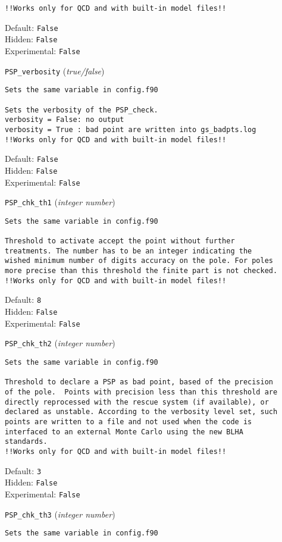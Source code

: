 \begin{basedescript}{\desclabelstyle{\pushlabel}}
\begin{verbatim}
!!Works only for QCD and with built-in model files!!
\end{verbatim}
Default: \verb|False|
\\Hidden: \verb|False|
\\Experimental: \verb|False|
\\\item[\colorbox{gray!30}{\texttt{PSP\_verbosity}}] (\textit{true/false})
\begin{verbatim}
Sets the same variable in config.f90

Sets the verbosity of the PSP_check.
verbosity = False: no output
verbosity = True : bad point are written into gs_badpts.log
!!Works only for QCD and with built-in model files!!
\end{verbatim}
Default: \verb|False|
\\Hidden: \verb|False|
\\Experimental: \verb|False|
\\\item[\colorbox{gray!30}{\texttt{PSP\_chk\_th1}}] (\textit{integer number})
\begin{verbatim}
Sets the same variable in config.f90

Threshold to activate accept the point without further
treatments. The number has to be an integer indicating the
wished minimum number of digits accuracy on the pole. For poles
more precise than this threshold the finite part is not checked.
!!Works only for QCD and with built-in model files!!
\end{verbatim}
Default: \verb|8|
\\Hidden: \verb|False|
\\Experimental: \verb|False|
\\\item[\colorbox{gray!30}{\texttt{PSP\_chk\_th2}}] (\textit{integer number})
\begin{verbatim}
Sets the same variable in config.f90

Threshold to declare a PSP as bad point, based of the precision
of the pole.  Points with precision less than this threshold are
directly reprocessed with the rescue system (if available), or
declared as unstable. According to the verbosity level set, such
points are written to a file and not used when the code is
interfaced to an external Monte Carlo using the new BLHA
standards.
!!Works only for QCD and with built-in model files!!
\end{verbatim}
Default: \verb|3|
\\Hidden: \verb|False|
\\Experimental: \verb|False|
\\\item[\colorbox{gray!30}{\texttt{PSP\_chk\_th3}}] (\textit{integer number})
\begin{verbatim}
Sets the same variable in config.f90


\end{verbatim}
\end{basedescript}
